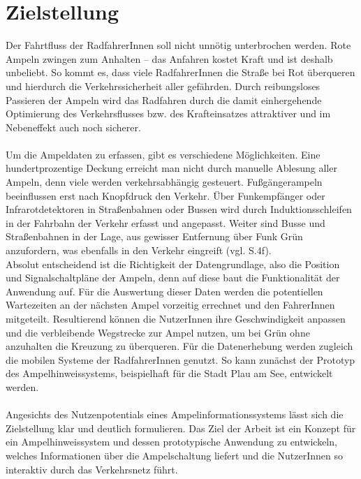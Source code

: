 \section{Zielstellung}
Der Fahrtfluss der RadfahrerInnen soll nicht unnötig unterbrochen werden. Rote Ampeln zwingen zum Anhalten -- das Anfahren kostet Kraft und ist deshalb unbeliebt. So kommt es, dass viele RadfahrerInnen die Straße bei Rot überqueren und hierdurch die Verkehrssicherheit aller gefährden. Durch reibungsloses Passieren der Ampeln wird das Radfahren durch die damit einhergehende Optimierung des Verkehrsflusses bzw. des Krafteinsatzes attraktiver und im Nebeneffekt auch noch sicherer.\\\\
Um die Ampeldaten zu erfassen, gibt es verschiedene Möglichkeiten. Eine hundertprozentige Deckung erreicht man nicht durch manuelle Ablesung aller Ampeln, denn viele  werden verkehrsabhängig gesteuert. Fußgängerampeln beeinflussen erst nach Knopfdruck den Verkehr. Über Funkempfänger oder Infrarotdetektoren in Straßenbahnen oder Bussen wird durch Induktionsschleifen in der Fahrbahn der Verkehr erfasst und angepasst. Weiter sind Busse und Straßenbahnen in der Lage, aus gewisser Entfernung über Funk Grün anzufordern, was ebenfalls in den Verkehr eingreift (vgl. \cite{lsa_bln} S.4f). \\
Absolut entscheidend ist die Richtigkeit der Datengrundlage, also die Position und Signalschaltpläne der Ampeln, denn auf diese baut die Funktionalität der Anwendung auf.
Für die Auswertung dieser Daten werden die potentiellen Wartezeiten an der nächsten Ampel vorzeitig errechnet und den FahrerInnen mitgeteilt. Resultierend können die NutzerInnen ihre Geschwindigkeit anpassen und die verbleibende Wegstrecke zur Ampel nutzen, um bei Grün ohne anzuhalten die Kreuzung zu überqueren. Für die Datenerhebung werden zugleich die mobilen Systeme der RadfahrerInnen genutzt. So kann zunächst der Prototyp des Ampelhinweissystems, beispielhaft für die Stadt Plau am See, entwickelt werden.\\\\
Angesichts des Nutzenpotentials eines Ampelinformationssystems lässt sich die Zielstellung klar und deutlich formulieren. Das Ziel der Arbeit ist ein Konzept für ein Ampelhinweissystem und dessen prototypische Anwendung zu entwickeln, welches Informationen über die Ampelschaltung liefert und die NutzerInnen so interaktiv durch das Verkehrsnetz führt.